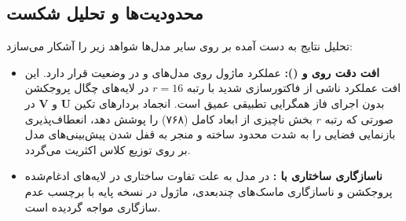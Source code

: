 \subsection{محدودیت‌ها و تحلیل شکست}
تحلیل نتایج به دست آمده بر روی سایر مدل‌ها شواهد زیر را آشکار می‌سازد:
\begin{itemize}
    \item \textbf{افت دقت روی  و  ():} عملکرد ماژول روی مدل‌های  و  در وضعیت  قرار دارد. این افت عملکرد ناشی از فاکتورسازی شدید با رتبه $r=16$ در لایه‌های چگال پروجکشن بدون اجرای فاز همگرایی تطبیقی عمیق است. انجماد بردارهای تکین $\mathbf{U}$ و $\mathbf{V}$ در صورتی که رتبه $r$ بخش ناچیزی از ابعاد کامل (۷۶۸) را پوشش دهد، انعطاف‌پذیری بازنمایی فضایی را به شدت محدود ساخته و منجر به قفل شدن پیش‌بینی‌های مدل بر روی توزیع کلاس اکثریت می‌گردد.
    \item \textbf{ناسازگاری ساختاری با :} در مدل  به علت تفاوت ساختاری در لایه‌های ادغام‌شده پروجکشن  و ناسازگاری ماسک‌های چندبعدی، ماژول در نسخه پایه با برچسب عدم سازگاری مواجه گردیده است.
\end{itemize}
